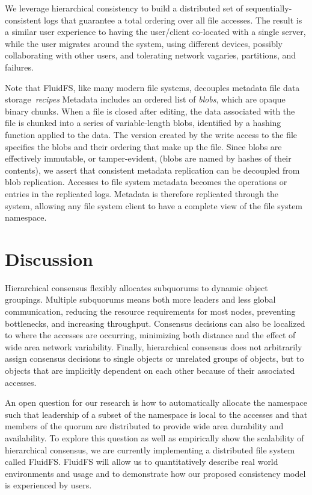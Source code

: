 \documentclass[sigconf]{acmart}
\begin{document}
We leverage hierarchical consistency to build a distributed set of sequentially-consistent logs
that guarantee a total ordering over all file accesses.
The result is a similar user experience to having the user/client co-located with a single
server, while the user migrates around the system, using different devices, possibly
collaborating with other users, and tolerating network vagaries, partitions, and failures.

Note that FluidFS, like many modern file systems,
decouples metadata file
data storage~\emph{recipes}
Metadata includes an ordered list of \emph{blobs}, which are opaque binary chunks.
When a file is closed after editing, the data associated with the file is chunked into a
series of variable-length blobs, identified by a hashing function applied to
the data.
The version created by the write access to the file specifies the blobs and their ordering
that make up the file.
Since blobs are effectively immutable, or tamper-evident, (blobs are named by hashes of
their contents), we assert that consistent metadata replication can be decoupled from blob
replication.
Accesses to file system metadata becomes the operations or entries in the replicated logs.
Metadata is therefore replicated through the system, allowing any file
system client to have a complete view of the file system namespace.

\section{Discussion}

Hierarchical consensus flexibly allocates subquorums to dynamic object groupings.
Multiple subquorums means both more leaders and less global communication, reducing the
resource requirements for most nodes, preventing bottlenecks, and increasing throughput.
Consensus decisions can also be localized to where the accesses are occurring,
minimizing both distance and the effect of wide area network variability.
Finally, hierarchical consensus does not arbitrarily assign consensus decisions to single
objects or unrelated groups of objects, but to objects that are implicitly dependent on
each other because of their associated accesses.

An open question for our research is how to automatically allocate the namespace such that
leadership of a subset of the namespace is local to the accesses and that members of the
quorum are distributed to provide wide area durability and availability.
To explore this question as well as empirically show the scalability of hierarchical
consensus, we are currently implementing a distributed file system called FluidFS.
FluidFS will allow us to quantitatively describe real world environments and usage and
to demonstrate how our proposed consistency model is experienced by users.



\end{document}
